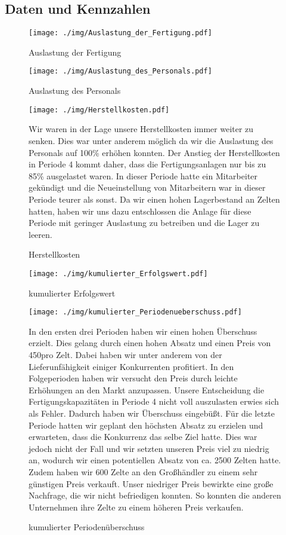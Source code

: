 \documentclass[a4paper, 12pt]{report}
\begin{document}
\begin{flushleft}
\chapter{Daten und Kennzahlen}
 
 \begin{figure}[th]
 \centering 
 \texttt{[image: ./img/Auslastung\_der\_Fertigung.pdf]}
 \caption[Auslastung der Fertigung]{Auslastung der Fertigung}
  \texttt{[image: ./img/Auslastung\_des\_Personals.pdf]}
  \caption[Auslastung des Personals]{Auslastung des Personals}  
\end{figure}

 
 \begin{figure}[th]
 \centering 
 \texttt{[image: ./img/Herstellkosten.pdf]}
  \caption[Herstellkosten]{Herstellkosten}
\begin{flushleft}
Wir waren in der Lage unsere Herstellkosten immer weiter zu senken. Dies war unter anderem möglich da wir die Auslastung des Personals auf 100\% erhöhen konnten. 
Der Anstieg der Herstellkosten in Periode 4 kommt daher, dass die Fertigungsanlagen nur bis zu 85\% ausgelastet waren.
In dieser Periode hatte ein Mitarbeiter gekündigt und die Neueinstellung von Mitarbeitern war in dieser Periode teurer als sonst.
Da wir einen hohen Lagerbestand an Zelten hatten, haben wir uns dazu entschlossen die Anlage für diese Periode mit geringer Auslastung zu betreiben und die Lager zu leeren.
\end{flushleft}
\end{figure}




 \begin{figure}[b]
 \centering 
 \texttt{[image: ./img/kumulierter\_Erfolgswert.pdf]}
  \caption[kumulierter Erfolgswert]{kumulierter Erfolgswert}
\end{figure}
 
 \begin{figure}
 \centering 
 \texttt{[image: ./img/kumulierter\_Periodenueberschuss.pdf]}
  \caption[kumulierter Periodenüberschuss]
  {kumulierter Periodenüberschuss}
  \begin{flushleft}
In den ersten drei Perioden haben wir einen hohen Überschuss erzielt.
Dies gelang durch einen hohen Absatz und einen Preis von 450\texteuro pro Zelt. 
Dabei haben wir unter anderem von der Lieferunfähigkeit einiger Konkurrenten profitiert.
In den Folgeperioden haben wir versucht den Preis durch leichte Erhöhungen an den Markt anzupassen.
Unsere Entscheidung die Fertigungskapazitäten in Periode 4 nicht voll auszulasten erwies sich als Fehler.
Dadurch haben wir Überschuss eingebüßt. 
Für die letzte Periode hatten wir geplant den höchsten Absatz zu erzielen und erwarteten, dass die Konkurrenz das selbe Ziel hatte. Dies war jedoch nicht der Fall und wir setzten unseren Preis viel zu niedrig an, wodurch wir einen potentiellen Absatz von ca. 2500 Zelten hatte.
Zudem haben wir 600 Zelte an den Großhändler zu einem sehr günstigen Preis verkauft.
Unser niedriger Preis bewirkte eine große Nachfrage, die wir nicht befriedigen konnten.
So konnten die anderen Unternehmen ihre Zelte zu einem höheren Preis verkaufen.
  \end{flushleft}
\end{figure}


\end{flushleft}
\end{document}

